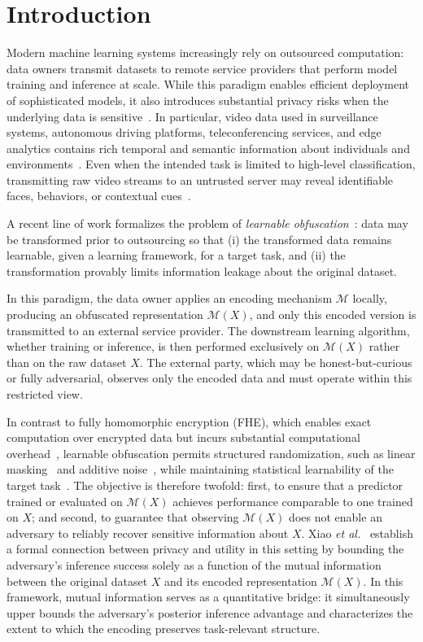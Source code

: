 \documentclass[letterpaper]{article} %
\begin{document}
\section{Introduction}

Modern machine learning systems increasingly rely on outsourced computation: data owners transmit datasets to remote service providers that perform model training and inference at scale. While this paradigm enables efficient deployment of sophisticated models, it also introduces substantial privacy risks when the underlying data is sensitive~\cite{shan2018practical}. In particular, video data used in surveillance systems, autonomous driving platforms, teleconferencing services, and edge analytics contains rich temporal and semantic information about individuals and environments~\cite{zhou2019discovering}. Even when the intended task is limited to high-level classification, transmitting raw video streams to an untrusted server may reveal identifiable faces, behaviors, or contextual cues~\cite{yu2018pinto}.

A recent line of work formalizes the problem of \emph{learnable obfuscation}~\cite{christiano2024backdoor}: data may be transformed prior to outsourcing so that (i) the transformed data remains learnable, given a learning framework, for a target task, and (ii) the transformation provably limits information leakage about the original dataset.

In this paradigm, the data owner applies an encoding mechanism $\mathcal{M}$ locally, producing an obfuscated representation $\mathcal{M}(X)$, and only this encoded version is transmitted to an external service provider. The downstream learning algorithm, whether training or inference, is then performed exclusively on $\mathcal{M}(X)$ rather than on the raw dataset $X$. The external party, which may be honest-but-curious or fully adversarial, observes only the encoded data and must operate within this restricted view.

In contrast to fully homomorphic encryption (FHE), which enables exact computation over encrypted data but incurs substantial computational overhead~\cite{gentry2009fhe,gorantala2023fhe}, learnable obfuscation permits structured randomization, such as linear masking~\cite{yala2021neuracrypt} and additive noise~\cite{xiao2025one}, while maintaining statistical learnability of the target task~\cite{xiao2023pacprivacy,xiao2024formal}. The objective is therefore twofold: first, to ensure that a predictor trained or evaluated on $\mathcal{M}(X)$ achieves performance comparable to one trained on $X$; and second, to guarantee that observing $\mathcal{M}(X)$ does not enable an adversary to reliably recover sensitive information about $X$. Xiao \textit{et al.}~\cite{xiao2024formal} establish a formal connection between privacy and utility in this setting by bounding the adversary's inference success solely as a function of the mutual information between the original dataset $X$ and its encoded representation $\mathcal{M}(X)$. In this framework, mutual information serves as a quantitative bridge: it simultaneously upper bounds the adversary's posterior inference advantage and characterizes the extent to which the encoding preserves task-relevant structure.
\end{document}
